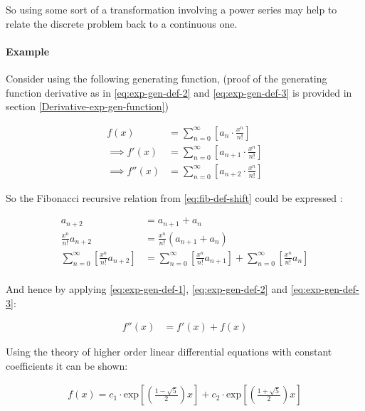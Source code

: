 \documentclass[11pt]{article}
\begin{document}
So using some sort of a transformation involving a power series may help to
relate the discrete problem back to a continuous one.

\paragraph{Example}
\label{solving-the-sequence}
Consider using the following generating function, (proof of the
generating function derivative as in \eqref{eq:exp-gen-def-2} and \eqref{eq:exp-gen-def-3} is
provided in section \ref{Derivative-exp-gen-function})




\begin{align}
    f\left( x \right) &=  \sum^{\infty}_{n= 0}   \left[ a_{n} \cdot  \frac{x^n}{n!} \right]   \label{eq:exp-gen-def-1} \\
 \implies   f'\left( x \right) &=  \sum^{\infty}_{n= 0}   \left[ a_{n+1} \cdot  \frac{x^n}{n!} \right]   \label{eq:exp-gen-def-2} \\
\implies    f''\left( x \right) &=  \sum^{\infty}_{n= 0}   \left[ a_{n+2} \cdot  \frac{x^n}{n!} \right]   \label{eq:exp-gen-def-3}
\end{align}


So the Fibonacci recursive relation from \eqref{eq:fib-def-shift}  could be expressed :


\begin{align*}
a_{n+  2}    &= a_{n+  1} +  a_{n}\\
\frac{x^n}{n!}   a_{n+  2}    &= \frac{x^n}{n!}\left( a_{n+  1} +  a_{n}  \right)\\
\sum^{\infty}_{n= 0} \left[ \frac{x^n}{n!}   a_{n+  2} \right]        &= \sum^{\infty}_{n= 0}   \left[ \frac{x^n}{n!} a_{n+  1} \right]  + \sum^{\infty}_{n= 0}   \left[ \frac{x^n}{n!} a_{n}  \right]  \\
\end{align*}

And hence by applying \eqref{eq:exp-gen-def-1}, \eqref{eq:exp-gen-def-2} and \eqref{eq:exp-gen-def-3}:

\begin{align}
f''\left( x \right) &= f'\left( x \right)+  f\left( x \right)
\end{align}


Using the theory of higher order linear differential equations with
constant coefficients it can be shown:


\begin{align*}
f\left( x \right)= c_1 \cdot  \mathrm{exp}\left[ \left( \frac{1- \sqrt{5} }{2} \right)x \right] +  c_2 \cdot  \mathrm{exp}\left[ \left( \frac{1 +  \sqrt{5} }{2} \right)x \right]
\end{align*}
\end{document}

